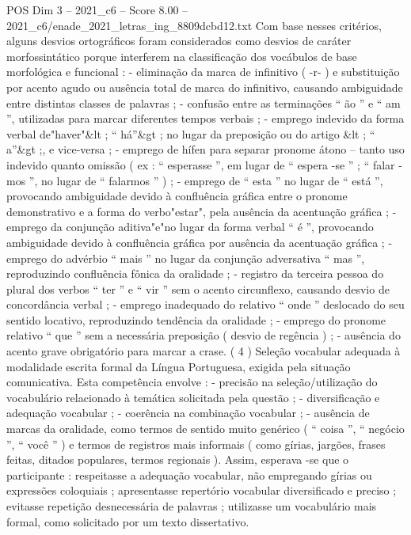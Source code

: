 \begin{textsample}{POS Dim 3 – 2021\_c6 – Score 8.00 – 2021\_c6/enade\_2021\_letras\_ing\_8809dcbd12.txt}
Com base nesses critérios, alguns desvios ortográficos foram considerados como desvios de caráter morfossintático porque interferem na classificação dos vocábulos de base morfológica e funcional : - eliminação da marca de infinitivo ( -r- ) e substituição por acento agudo ou ausência total de marca do infinitivo, causando ambiguidade entre distintas classes de palavras ; - confusão entre as terminações “ ão ” e “ am ”, utilizadas para marcar diferentes tempos verbais ; - emprego indevido da forma verbal de"haver"\&lt ; “ há”\&gt ; no lugar da preposição ou do artigo \&lt ; “ a”\&gt ;, e vice-versa ; - emprego de hífen para separar pronome átono – tanto uso indevido quanto omissão ( ex : “ esperasse ”, em lugar de “ espera -se ” ; “ falar -mos ”, no lugar de “ falarmos ” ) ; - emprego de “ esta ” no lugar de “ está ”, provocando ambiguidade devido à confluência gráfica entre o pronome demonstrativo e a forma do verbo"estar", pela ausência da acentuação gráfica ; - emprego da conjunção aditiva"e"no lugar da forma verbal “ é ”, provocando ambiguidade devido à confluência gráfica por ausência da acentuação gráfica ; - emprego do advérbio “ mais ” no lugar da conjunção adversativa “ mas ”, reproduzindo confluência fônica da oralidade ; - registro da terceira pessoa do plural dos verbos “ ter ” e “ vir ” sem o acento circunflexo, causando desvio de concordância verbal ; - emprego inadequado do relativo “ onde ” deslocado do seu sentido locativo, reproduzindo tendência da oralidade ; - emprego do pronome relativo “ que ” sem a necessária preposição ( desvio de regência ) ; - ausência do acento grave obrigatório para marcar a crase. ( 4 ) Seleção vocabular adequada à modalidade escrita formal da Língua Portuguesa, exigida pela situação comunicativa.
Esta competência envolve : - precisão na seleção/utilização do vocabulário relacionado à temática solicitada pela questão ; - diversificação e adequação vocabular ; - coerência na combinação vocabular ; - ausência de marcas da oralidade, como termos de sentido muito genérico ( “ coisa ”, “ negócio ”, “ você ” ) e termos de registros mais informais ( como gírias, jargões, frases feitas, ditados populares, termos regionais ).
Assim, esperava -se que o participante : respeitasse a adequação vocabular, não empregando gírias ou expressões coloquiais ; apresentasse repertório vocabular diversificado e preciso ; evitasse repetição desnecessária de palavras ; utilizasse um vocabulário mais formal, como solicitado por um texto dissertativo.

\end{textsample}
